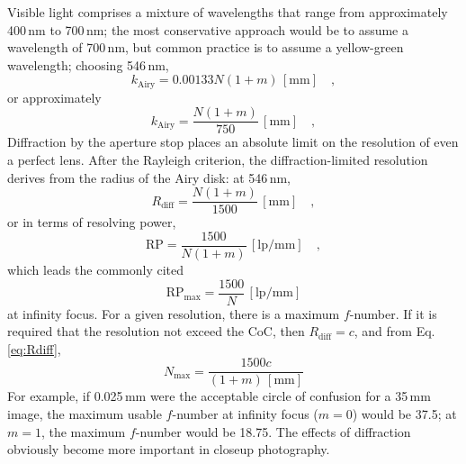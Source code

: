 \documentclass[11pt, oneside]{scrartcl}   	%
\begin{document}
Visible light comprises a mixture of wavelengths that range from
approximately 400\,nm to 700\,nm; the most conservative approach would
be to assume a wavelength of 700\,nm, but common practice is to assume
a yellow-green wavelength; choosing 546\,nm,
\begin{equation}
  \label{eq:airy2}
  k_\mathrm{Airy}  = 0.00133N(1+m)\,[\mathrm{mm}]\quad,
\end{equation}
or approximately
\begin{equation}
  \label{eq:airy3}
   k_\mathrm{Airy}  =\frac{N(1+m)}{750}\,[\mathrm{mm}]\quad,
\end{equation}
Diffraction by the aperture stop places an absolute limit on the resolution of even a perfect lens. After the Rayleigh criterion, the diffraction-limited resolution derives from the radius of the Airy disk: at 546\,nm,
\begin{equation}
  \label{eq:Rdiff}
  R_\mathrm{diff} = \frac{N (1+ m)}{1500}\,[\mathrm{mm}]\quad ,
\end{equation}
or in terms of resolving power,
\begin{equation}
  \label{eq:RP}
  \mathrm{RP} = \frac{1500}{N(1+m)}\,[\mathrm{lp/mm}]\quad,
\end{equation}
which leads the commonly cited
\begin{equation}
  \label{eq:RPmax}
  \mathrm{RP_\mathrm{max}}  = \frac{1500}N\,[\mathrm{lp/mm}]
\end{equation}
at infinity focus. For a given resolution, there is a maximum $f$-number. If it is required that the resolution not exceed the CoC, then $R_\mathrm{diff} = c$, and from Eq. \ref{eq:Rdiff},
\begin{equation}
   \label{eq:Nmax}
   N_\mathrm{max}=\frac{1500c}{(1+m)\,[\mathrm{mm}]}
\end{equation}
For example, if 0.025\,mm were the acceptable circle of confusion for a 35\,mm image, the maximum usable $f$-number at infinity focus ($m = 0$) would be 37.5; at $m = 1$, the maximum $f$-number would be 18.75. The effects of diffraction obviously become more important in closeup photography.
\end{document}
